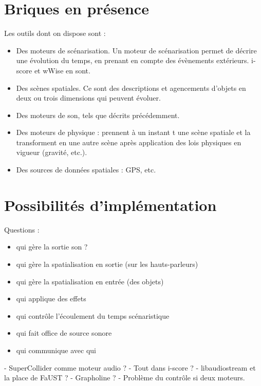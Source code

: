 \documentclass[french,12pt,a4paper]{article}
\begin{document}
\section{Briques en présence}
Les outils dont on dispose sont : 
\begin{itemize}
    \item Des moteurs de scénarisation. Un moteur de scénarisation permet de décrire une évolution du temps, 
    en prenant en compte des évènements extérieurs. 
    i-score et wWise en sont.
    \item Des scènes spatiales. 
    Ce sont des descriptions et agencements d'objets en deux ou trois dimensions qui peuvent évoluer.
    \item Des moteurs de son, tels que décrits précédemment.
    \item Des moteurs de physique : prennent à un instant t une scène spatiale et la transforment en une autre scène après application des lois physiques en vigueur (gravité, etc.).
    \item Des sources de données spatiales : GPS, etc.
\end{itemize}

\section{Possibilités d'implémentation}
Questions : 
\begin{itemize}
\item qui gère la sortie son ?
\item qui gère la spatialisation en sortie (sur les hauts-parleurs)
\item qui gère la spatialisation en entrée (des objets)
\item qui applique des effets
\item qui contrôle l'écoulement du temps scénaristique
\item qui fait office de source sonore
\item qui communique avec qui
\end{itemize}
- SuperCollider comme moteur audio ?
- Tout dans i-score ? 
- libaudiostream et la place de FaUST ?
- Grapholine ?
- Problème du contrôle si deux moteurs.
\end{document}
